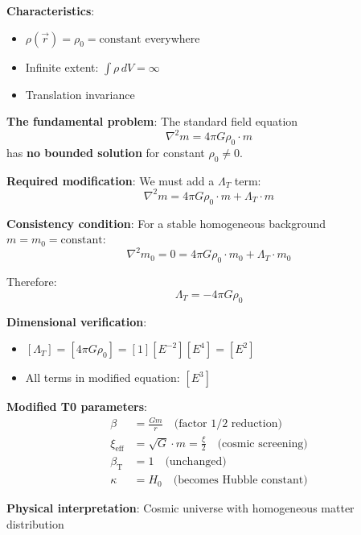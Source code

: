 \documentclass[12pt,a4paper]{article}
\newcommand{\betaT}{\beta_{\text{T}}}
\begin{document}
	\textbf{Characteristics}:
	\begin{itemize}
		\item $\rho(\vec{r}) = \rho_0 = \text{constant}$ everywhere
		\item Infinite extent: $\int \rho \, dV = \infty$
		\item Translation invariance
	\end{itemize}
	
	\textbf{The fundamental problem}: The standard field equation
	\begin{equation}
		\nabla^2 m = 4\pi G \rho_0 \cdot m
	\end{equation}
	has \textbf{no bounded solution} for constant $\rho_0 \neq 0$.
	
	\textbf{Required modification}: We must add a $\Lambda_T$ term:
	\begin{equation}
		\boxed{\nabla^2 m = 4\pi G \rho_0 \cdot m + \Lambda_T \cdot m}
	\end{equation}
	
	\textbf{Consistency condition}: For a stable homogeneous background $m = m_0 = \text{constant}$:
	\begin{equation}
		\nabla^2 m_0 = 0 = 4\pi G \rho_0 \cdot m_0 + \Lambda_T \cdot m_0
	\end{equation}
	
	Therefore:
	\begin{equation}
		\boxed{\Lambda_T = -4\pi G \rho_0}
	\end{equation}
	
	\textbf{Dimensional verification}:
	\begin{itemize}
		\item $[\Lambda_T] = [4\pi G \rho_0] = [1][E^{-2}][E^4] = [E^2]$ \checkmark
		\item All terms in modified equation: $[E^3]$ \checkmark
	\end{itemize}
	
	\textbf{Modified T0 parameters}:
	\begin{align}
		\beta &= \frac{Gm}{r} \quad \text{(factor 1/2 reduction)} \\
		\xi_{\text{eff}} &= \sqrt{G} \cdot m = \frac{\xi}{2} \quad \text{(cosmic screening)} \\
		\betaT &= 1 \quad \text{(unchanged)} \\
		\kappa &= H_0 \quad \text{(becomes Hubble constant)}
	\end{align}
	
	\textbf{Physical interpretation}: Cosmic universe with homogeneous matter distribution
	
\end{document}
